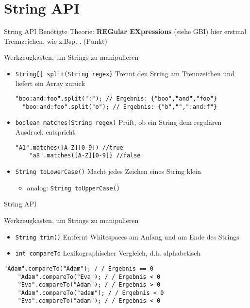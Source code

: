 \documentclass[18pt]{beamer}
\begin{document}
\section{String API}
\begin{frame}[fragile]{String API}
Benötigte Theorie: \textbf{REGular EXpressions} (siehe GBI) hier erstmal Trennzeichen, wie z.Bsp.     . (Punkt) \pause
\begin{block}{Werkzeugkasten, um Strings zu manipulieren}\pause
\begin{itemize}
	\item \lstinline{String[] split(String regex)} Trennt den String am Trennzeichen und liefert ein Array zurück\pause
	\begin{lstlisting}[basicstyle=\scriptsize]
	"boo:and:foo".split(":"); // Ergebnis: {"boo","and","foo"} 
  "boo:and:foo".split("o"); // Ergebnis: {"b","",":and:f"} 
	\end{lstlisting}  \pause
	\item \lstinline{boolean matches(String regex)} Prüft, ob ein String dem regulären Ausdruck entspricht \pause
	\begin{lstlisting}[basicstyle=\scriptsize]
	"A1".matches([A-Z][0-9]) //true 
	"a8".matches([A-Z][0-9]) //false 
	\end{lstlisting} \pause
	\item \lstinline{String toLowerCase()} Macht jedes Zeichen eines String klein\pause
	\begin{itemize}
		\item analog: \lstinline{String toUpperCase()} \pause
	\end{itemize}
\end{itemize}
\end{block}
\end{frame}


\begin{frame}[fragile]{String API}
\begin{block}{Werkzeugkasten, um Strings zu manipulieren} \pause
\begin{itemize}
\item \lstinline{String trim()} Entfernt Whitespaces am Anfang und am Ende des Strings \pause
\item \lstinline{int compareTo} Lexikographischer Vergleich, d.h. alphabetisch \pause
\end{itemize}	 \pause
\begin{lstlisting}[basicstyle=\footnotesize]
	"Adam".compareTo("Adam"); / / Ergebnis == 0 
	"Adam".compareTo("Eva"); / / Ergebnis < 0 
	"Eva".compareTo("Adam"); / / Ergebnis > 0 
	"Adam".compareTo("adam"); / / Ergebnis < 0 
	"Eva".compareTo("adam"); / / Ergebnis < 0 
\end{lstlisting} 
\end{block}
\end{frame}
\end{document}
